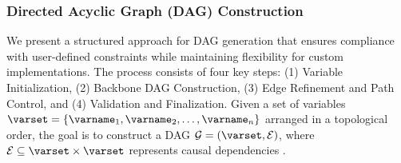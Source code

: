 \documentclass{uai2024} %
\begin{document}
        \subsubsection{Directed Acyclic Graph (DAG) Construction}
            We present a structured approach for DAG generation that ensures compliance with user-defined constraints while maintaining flexibility for custom implementations. 
            The process consists of four key steps: (1) Variable Initialization, (2) Backbone DAG Construction, (3) Edge Refinement and Path Control, and (4) Validation and Finalization. 
            Given a set of variables $ \varset = \{\varname_1, \varname_2, \dots, \varname_n\} $ arranged in a topological order, the goal is to construct a DAG $ \mathcal{G} = (\varset, \mathcal{E}) $, where $ \mathcal{E} \subseteq \varset \times \varset $ represents causal dependencies \citep{pearl}. 
            
\end{document}
